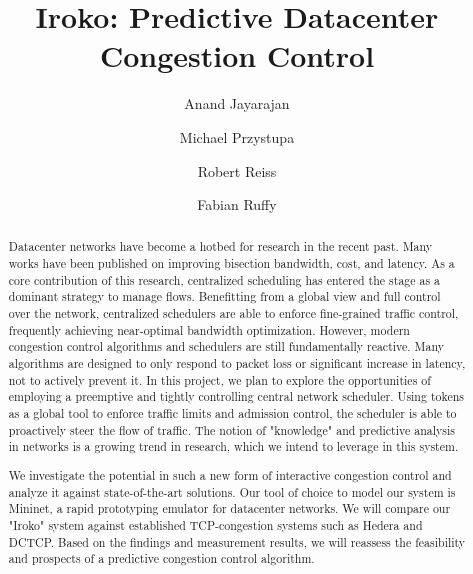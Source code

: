 \documentclass[sigconf]{acmart}
\begin{document}
\title{Iroko: Predictive Datacenter Congestion Control}

\author{Anand Jayarajan}

\author{Michael Przystupa}

\author{Robert Reiss}

\author{Fabian Ruffy}

\begin{abstract}
Datacenter networks have become a hotbed for research in the recent past. Many works have been published on improving bisection bandwidth, cost, and latency. As a core contribution of this research, centralized scheduling has entered the stage as a dominant strategy to manage flows. Benefitting from a global view and full control over the network, centralized schedulers are able to enforce fine-grained traffic control, frequently achieving near-optimal bandwidth optimization. However, modern congestion control algorithms and schedulers are still fundamentally reactive. Many algorithms are designed to only respond to packet loss or significant increase in latency, not to actively prevent it.
In this project, we plan to explore the opportunities of employing a preemptive and tightly controlling central network scheduler. Using tokens as a global tool to enforce traffic limits and admission control, the scheduler is able to proactively steer the flow of traffic. The notion of "knowledge" and predictive analysis in networks is a growing trend in research, which we intend to leverage in this system.

We investigate the potential in such a new form of interactive congestion control and analyze it against state-of-the-art solutions. Our tool of choice to model our system is Mininet, a rapid prototyping emulator for datacenter networks. We will compare our "Iroko" system against established TCP-congestion systems such as Hedera and DCTCP. Based on the findings and measurement results, we will reassess the feasibility and prospects of a predictive congestion control algorithm.
\end{abstract}





\maketitle



%






 
\end{document}
